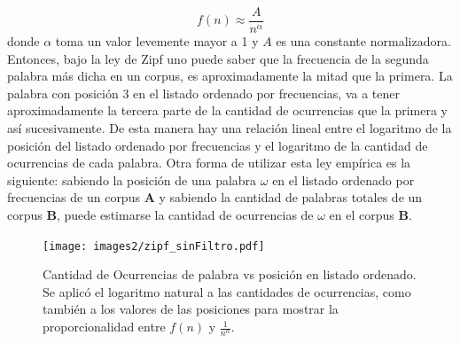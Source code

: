 $$f(n) \approx \frac{A}{n^{\alpha}}$$
donde $\alpha$ toma un valor levemente mayor a 1 y $A$ es una constante normalizadora.
Entonces, bajo la ley de Zipf uno puede saber que la frecuencia de la segunda palabra más dicha en un corpus, es aproximadamente la mitad que la primera. La palabra con posición 3 en el listado ordenado por frecuencias, va a tener aproximadamente la tercera parte de la cantidad de ocurrencias que la primera y así sucesivamente. De esta manera hay una relación lineal entre el logaritmo de la posición del listado ordenado por frecuencias y el logaritmo de la cantidad de ocurrencias de cada palabra.
Otra forma de utilizar esta ley empírica es la siguiente:
sabiendo la posición de una palabra $\omega$ en el listado ordenado por frecuencias de un corpus \textbf{A} y sabiendo la cantidad de palabras totales de un corpus \textbf{B}, puede estimarse la cantidad de ocurrencias de $\omega$ en el corpus \textbf{B}.

\begin{figure}[!ht]
\centering
\texttt{[image: images2/zipf\_sinFiltro.pdf]}
\caption{Cantidad de Ocurrencias de palabra vs posición en listado ordenado. Se aplicó el logaritmo natural a las cantidades de ocurrencias, como también a los valores de las posiciones para mostrar la proporcionalidad entre $f(n)$ y $\frac{1}{n^{\alpha}}$.} 
\label{fig:zipf} 
\end{figure}











